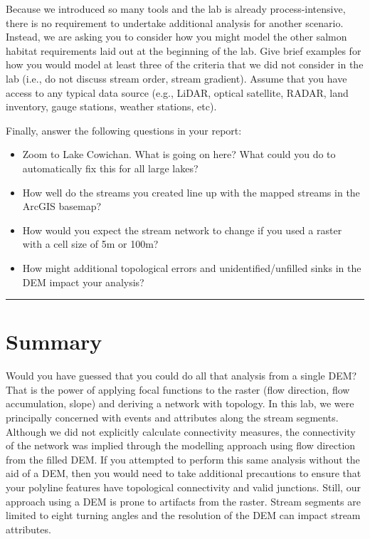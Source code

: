 \documentclass[
]{book}
\providecommand{\tightlist}{%
  \setlength{\itemsep}{0pt}\setlength{\parskip}{0pt}}
\begin{document}
Because we introduced so many tools and the lab is already process-intensive, there is no requirement to undertake additional analysis for another scenario. Instead, we are asking you to consider how you might model the other salmon habitat requirements laid out at the beginning of the lab. Give brief examples for how you would model at least three of the criteria that we did not consider in the lab (i.e., do not discuss stream order, stream gradient). Assume that you have access to any typical data source (e.g., LiDAR, optical satellite, RADAR, land inventory, gauge stations, weather stations, etc).

Finally, answer the following questions in your report:

\begin{itemize}
\tightlist
\item
  Zoom to Lake Cowichan. What is going on here? What could you do to automatically fix this for all large lakes?
\item
  How well do the streams you created line up with the mapped streams in the ArcGIS basemap?
\item
  How would you expect the stream network to change if you used a raster with a cell size of 5m or 100m?
\item
  How might additional topological errors and unidentified/unfilled sinks in the DEM impact your analysis?
\end{itemize}

\begin{center}\rule{0.5\linewidth}{0.5pt}\end{center}

\hypertarget{summary-1}{%
\section*{Summary}\label{summary-1}}

Would you have guessed that you could do all that analysis from a single DEM? That is the power of applying focal functions to the raster (flow direction, flow accumulation, slope) and deriving a network with topology. In this lab, we were principally concerned with events and attributes along the stream segments. Although we did not explicitly calculate connectivity measures, the connectivity of the network was implied through the modelling approach using flow direction from the filled DEM. If you attempted to perform this same analysis without the aid of a DEM, then you would need to take additional precautions to ensure that your polyline features have topological connectivity and valid junctions. Still, our approach using a DEM is prone to artifacts from the raster. Stream segments are limited to eight turning angles and the resolution of the DEM can impact stream attributes.
\end{document}
